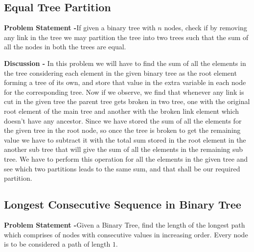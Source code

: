 \documentclass[12pt,a4paper,draft]{article}
\begin{document}
\subsection{Equal Tree Partition}
\textbf{Problem Statement -}If given a binary tree with $n$ nodes, check if by removing any link in the tree we may partition the tree into two trees such that the sum of all the nodes in both the trees are equal.
\begin{center}
\end{center}
\textbf{Discussion -} In this problem we will have to find the sum of all the elements in the tree considering each element in the given binary tree as the root element forming a tree of its own, and store that value in the extra variable in each node for the corresponding tree. Now if we observe, we find that whenever any link is cut in the given tree the parent tree gets broken in two tree, one with the original root element of the main tree and another with the broken link element which doesn't have any ancestor. Since we have stored the sum of all the elements for the given tree in the root node, so once the tree is broken to get the remaining value we have to subtract it with the total sum stored in the root element in the another sub tree that will give the sum of all the elements in the remaining sub tree. We have to perform this operation for all the elements in the given tree and see which two partitions leads to the same sum, and that shall be our required partition.
\subsection{Longest Consecutive Sequence in Binary Tree}
\textbf{Problem Statement -}Given a Binary Tree, find the length of the longest path which comprises of nodes with consecutive values in increasing order. Every node is to be considered a path of length $1$.  
\end{document}
